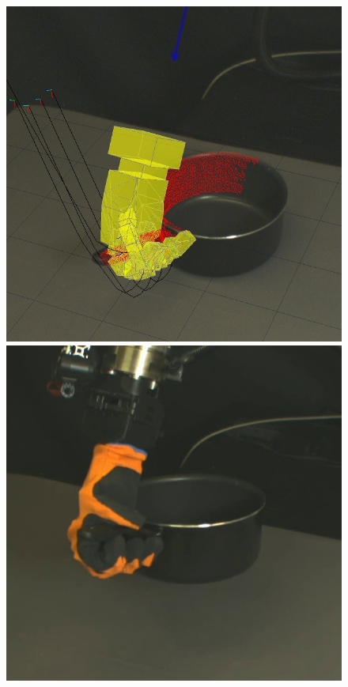 \begin{figure}
\begin{center}
  \includegraphics[width=\tw]{images/experiments/query/saucepanlarge-handle-1-s} \hspace{-6pt}
 \includegraphics[width=\tw]{images/experiments/exec/saucepanlarge-handle-s} 

\end{center}
\end{figure}
